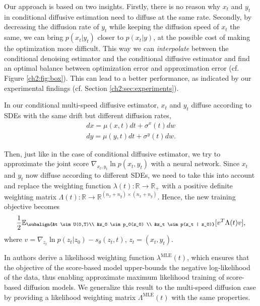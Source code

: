 Our approach is based on two insights. Firstly, there is no reason why $x_t$ and $y_t$ in conditional diffusive estimation need to diffuse at the same rate. Secondly, by decreasing the diffusion rate of $y_t$ while keeping the diffusion speed of $x_t$ the same, we can bring $p(x_t |y_t)$ closer to $p(x_t |y)$, at the possible cost of making the optimization more difficult. This way we can \emph{interpolate} between the conditional denoising estimator and the conditional diffusive estimator and find an optimal balance between optimization error and approximation error (cf. Figure \ref{ch2:fig:box}). This can lead to a better performance, as indicated by our experimental findings (cf. Section \ref{ch2:sec:experiments}).

In our conditional multi-speed diffusive estimator, $x_t$ and $y_t$ diffuse according to SDEs with the same drift but different diffusion rates,
\begin{gather*}
    dx = \mu(x,t)dt+\sigma^x(t)dw  \\
    dy = \mu(y,t)dt+\sigma^y(t)dw.
\end{gather*}


Then, just like in the case of conditional diffusive estimator, we try to approximate the joint score $\nabla_{x_t, y_t} \ln p(x_t, y_t)$ with a neural network. Since $x_t$ and $y_t$ now diffuse according to different SDEs, we need to take this into account and replace the weighting function $\lambda(t):\mathbb{R} \xrightarrow{} \mathbb{R}_+ $ with a positive definite weighting matrix $\Lambda(t): \mathbb{R} \xrightarrow{} \mathbb{R}^{(n_x + n_y) \times (n_x + n_y)}$. Hence, the new training objective becomes
\begin{gather}
    \label{ch2:eq:CMDE}
    \begin{aligned}
        \frac{1}{2} \mathbb{E}_{\subalign{&t \sim U(0,T)\\ &z_0 \sim p_0(z_0) \\ &z_t \sim p(z_t | z_0)}} 
        [
            v^T \Lambda(t) v
        ],
    \end{aligned}
\end{gather}
where $v=\nabla_{z_t} \ln{p(z_t |z_0)} - s_\theta(z_t,t)$, $z_t=(x_t,y_t)$.

In \cite{song2021maximum} authors derive a likelihood weighting function $\lambda^{\text{MLE}}(t)$, which ensures that the objective of the score-based model upper-bounds the negative log-likelihood of the data, thus enabling approximate maximum likelihood training of score-based diffusion models. We generalize this result to the multi-speed diffusion case by providing a likelihood weighting matrix $\Lambda^{\text{MLE}}(t)$ with the same properties.

